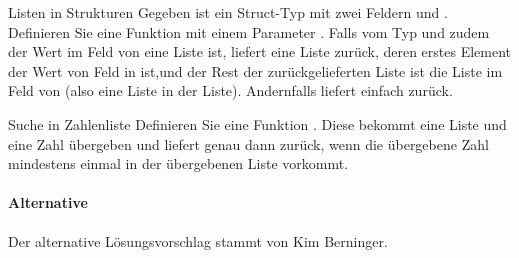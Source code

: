 \documentclass{../tuda-exercise}
\begin{document}
  \clearpagesolution

  \begin{task}[credit=\stars{1}{3}]{Listen in Strukturen}
    Gegeben ist ein Struct-Typ  mit zwei Feldern  und
    . Definieren Sie eine Funktion  mit einem Parameter
    . Falls  vom Typ  und zudem der Wert im
    Feld  von  eine Liste ist, liefert  eine
    Liste zurück, deren erstes Element der Wert von Feld  in 
    ist,und der Rest der zurückgelieferten Liste ist die Liste im Feld  von
     (also eine Liste in der Liste). Andernfalls liefert 
    einfach  zurück.

    \begin{solution}
      
    \end{solution}
  \end{task}

  \begin{task}[credit=\stars{2}{3}]{Suche in Zahlenliste}
    \label{task:V9}
    Definieren Sie eine Funktion . Diese bekommt eine Liste und eine
    Zahl übergeben und liefert genau dann  zurück, wenn die übergebene Zahl
    mindestens einmal in der übergebenen Liste vorkommt.

    \begin{solution}
      

      \clearpage

      \paragraph{Alternative}

      Der alternative Lösungsvorschlag stammt von Kim Berninger.
      
    \end{solution}
  \end{task}
\end{document}
